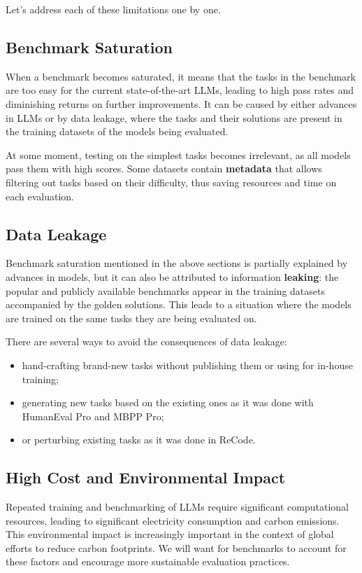 Let's address each of these limitations one by one.

\subsection{Benchmark Saturation}

When a benchmark becomes saturated, it means that the tasks in the benchmark are too easy for the current state-of-the-art LLMs, leading to high pass rates and diminishing returns on further improvements.
It can be caused by either advances in LLMs or by data leakage, where the tasks and their solutions are present in the training datasets of the models being evaluated.

At some moment, testing on the simplest tasks becomes irrelevant, as all models pass them with high scores.
Some datasets contain \textbf{metadata} that allows filtering out tasks based on their difficulty, thus saving resources and time on each evaluation.

\subsection{Data Leakage}

Benchmark saturation mentioned in the above sections is partially explained by advances in models, but it can also be attributed to information \textbf{leaking}: the popular and publicly available benchmarks appear in the training datasets accompanied by the golden solutions.
This leads to a situation where the models are trained on the same tasks they are being evaluated on.

There are several ways to avoid the consequences of data leakage:
\begin{itemize}
    \item hand-crafting brand-new tasks without publishing them or using for in-house training;
    \item generating new tasks based on the existing ones as it was done with HumanEval Pro and MBPP Pro;
    \item or perturbing existing tasks as it was done in ReCode.
\end{itemize}

\subsection{High Cost and Environmental Impact}

Repeated training and benchmarking of LLMs require significant computational resources, leading to significant electricity consumption and carbon emissions.
This environmental impact is increasingly important in the context of global efforts to reduce carbon footprints.
We will want for benchmarks to account for these factors and encourage more sustainable evaluation practices.


